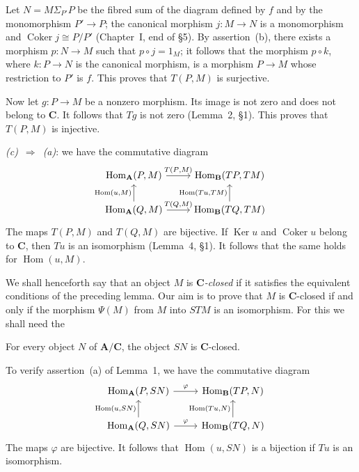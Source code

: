Let $N=M\Sigma_{P'}P$ be the fibred sum of the diagram defined by $f$ and by the
monomorphism $P'\to P$; the canonical morphism $j\colon M\to N$ is a
monomorphism and $\operatorname{Coker}j\cong P/P'$
(Chapter~I, end of \S5). By assertion~(b), there exists a morphism $p\colon
N\to M$ such that $p\circ j=1_M$; it follows that the morphism
$p\circ k$, where $k\colon P\to N$ is the canonical morphism, is a
morphism $P\to M$ whose restriction to $P'$ is $f$. This proves that
$T(P,M)$ is surjective.

Now let $g\colon P\to M$ be a nonzero morphism. Its image is not zero and
does not belong to $\mathbf C$. It follows that $Tg$ is not zero
(Lemma~2, \S1). This proves that $T(P,M)$ is injective.

\emph{(c)}~$\Rightarrow$~\emph{(a)}: we have the commutative diagram
\[
\begin{tikzcd}
\operatorname{Hom}_{\mathbf A}(P,M) \arrow[r, "T(P{,}M)"] &
\operatorname{Hom}_{\mathbf B}(TP,TM)\\
\operatorname{Hom}_{\mathbf A}(Q,M) \arrow[u, "\operatorname{Hom}(u{,}M)"]
\arrow[r, "T(Q{,}M)"] &
\operatorname{Hom}_{\mathbf B}(TQ,TM) \arrow[u, "\operatorname{Hom}(Tu{,}TM)"]
\end{tikzcd}
\]
The maps $T(P,M)$ and $T(Q,M)$ are bijective. If $\operatorname{Ker}u$
and $\operatorname{Coker}u$ belong to $\mathbf C$, then $Tu$ is an
isomorphism (Lemma~4, \S1). It follows that the same holds for
$\operatorname{Hom}(u,M)$.

We shall henceforth say that an object $M$ is
\emph{$\mathbf C$-closed} if it satisfies the equivalent conditions of the
preceding lemma. Our aim is to prove that $M$ is $\mathbf C$-closed if
and only if the morphism $\Psi(M)$ from $M$ into $STM$ is an
isomorphism. For this we shall need the

\begin{lemma}
For every object $N$ of $\mathbf A/\mathbf C$, the object $SN$ is
$\mathbf C$-closed.
\end{lemma}

To verify assertion~(a) of Lemma~1, we have the commutative diagram
\[
\begin{tikzcd}
\operatorname{Hom}_{\mathbf A}(P,SN) \arrow[r, "\varphi"] &
\operatorname{Hom}_{\mathbf B}(TP,N)\\
\operatorname{Hom}_{\mathbf A}(Q,SN) \arrow[u, "\operatorname{Hom}(u{,}SN)"]
\arrow[r, "\varphi"] &
\operatorname{Hom}_{\mathbf B}(TQ,N) \arrow[u, "\operatorname{Hom}(Tu{,}N)"]
\end{tikzcd}
\]
The maps $\varphi$ are bijective. It follows that
$\operatorname{Hom}(u,SN)$ is a bijection if $Tu$ is an isomorphism.

